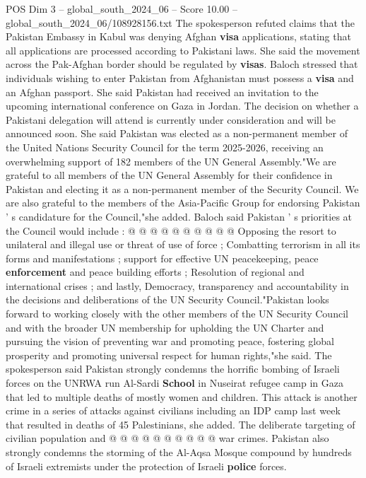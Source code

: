 \begin{textsample}{POS Dim 3 – global\_south\_2024\_06 – Score 10.00 – global\_south\_2024\_06/108928156.txt}  \label{ex:f3_pos_343}
The spokesperson refuted claims that the Pakistan Embassy in Kabul was denying Afghan \textbf{visa} applications, stating that all applications are processed according to Pakistani laws.
She said the movement across the Pak-Afghan border should be regulated by \textbf{visas}.
Baloch stressed that individuals wishing to enter Pakistan from Afghanistan must possess a \textbf{visa} and an Afghan passport.
She said Pakistan had received an invitation to the upcoming international conference on Gaza in Jordan.
The decision on whether a Pakistani delegation will attend is currently under consideration and will be announced soon.
She said Pakistan was elected as a non-permanent member of the United Nations Security Council for the term 2025-2026, receiving an overwhelming support of 182 members of the UN General Assembly."We are grateful to all members of the UN General Assembly for their confidence in Pakistan and electing it as a non-permanent member of the Security Council.
We are also grateful to the members of the Asia-Pacific Group for endorsing Pakistan ' s candidature for the Council,"she added.
Baloch said Pakistan ' s priorities at the Council would include : @ @ @ @ @ @ @ @ @ @ Opposing the resort to unilateral and illegal use or threat of use of force ; Combatting terrorism in all its forms and manifestations ; support for effective UN peacekeeping, peace \textbf{enforcement} and peace building efforts ; Resolution of regional and international crises ; and lastly, Democracy, transparency and accountability in the decisions and deliberations of the UN Security Council."Pakistan looks forward to working closely with the other members of the UN Security Council and with the broader UN membership for upholding the UN Charter and pursuing the vision of preventing war and promoting peace, fostering global prosperity and promoting universal respect for human rights,"she said.
The spokesperson said Pakistan strongly condemns the horrific bombing of Israeli forces on the UNRWA run Al-Sardi \textbf{School} in Nuseirat refugee camp in Gaza that led to multiple deaths of mostly women and children.
This attack is another crime in a series of attacks against civilians including an IDP camp last week that resulted in deaths of 45 Palestinians, she added.
The deliberate targeting of civilian population and @ @ @ @ @ @ @ @ @ @ war crimes.
Pakistan also strongly condemns the storming of the Al-Aqsa Mosque compound by hundreds of Israeli extremists under the protection of Israeli \textbf{police} forces.

\end{textsample}

